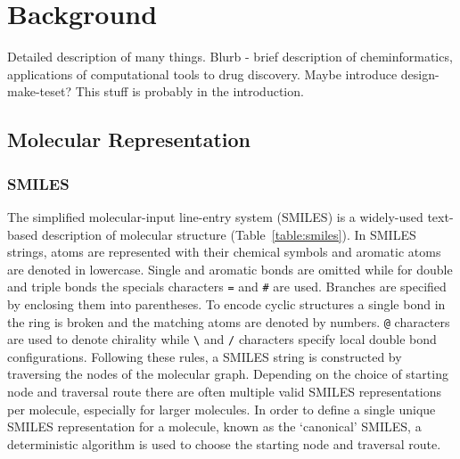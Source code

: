 \chapter{Background} \label{ch:background}

Detailed description of many things. Blurb - brief description of cheminformatics, applications of computational tools to drug discovery. Maybe introduce design-make-teset? This stuff is probably in the introduction.

\section{Molecular Representation}

\subsection{SMILES}
The simplified molecular-input line-entry system (SMILES)  \cite{Weininger1988, Weininger1989} is a widely-used text-based description of molecular structure (Table~\ref{table:smiles}). In SMILES strings, atoms are represented with their chemical symbols and aromatic atoms are denoted in lowercase. Single and aromatic bonds are omitted while for double and triple bonds the specials characters \texttt{=} and \texttt{\#} are used. Branches are specified by enclosing them into parentheses. To encode cyclic structures a single bond in the ring is broken and the matching atoms are denoted by numbers. \texttt{@} characters are used to denote chirality while \texttt{\textbackslash} and \texttt{/} characters specify local double bond configurations. Following these rules, a SMILES string is constructed by traversing the nodes of the molecular graph. Depending on the choice of starting node and traversal route there are often multiple valid SMILES representations per molecule, especially for larger molecules. In order to define a single unique SMILES representation for a molecule, known as the `canonical' SMILES, a deterministic algorithm is used to choose the starting node and traversal route.


